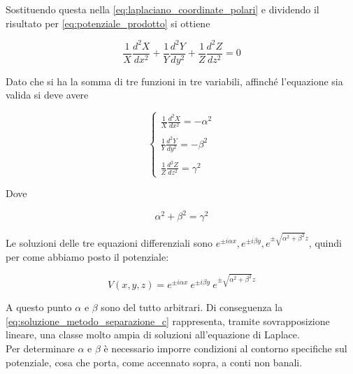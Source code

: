 Sostituendo questa nella \ref{eq:laplaciano_coordinate_polari} e dividendo il risultato per \ref{eq:potenziale_prodotto} si ottiene 

\begin{equation}
    \frac{1}{X} \frac{d^2 X}{dx^2} + \frac{1}{Y} \frac{d^2 Y}{dy^2} + \frac{1}{Z} \frac{d^2 Z}{dz^2} = 0 
\end{equation}

Dato che si ha la somma di tre funzioni in tre variabili, affinché l'equazione sia valida si deve avere  

\begin{equation}
    \begin{cases}
    \frac{1}{X} \frac{d^2 X}{dx^2} = - \alpha ^2\\
    \\
    \frac{1}{Y} \frac{d^2 Y}{dy^2} = - \beta^2 \\
    \\
    \frac{1}{Z} \frac{d^2 Z}{dz^2} = \gamma ^2
    \end{cases}
\end{equation}

Dove

\begin{equation*}
    \alpha ^2 + \beta^2 = \gamma ^2
\end{equation*}

Le soluzioni delle tre equazioni differenziali sono $e^{\pm i \alpha x}, e^{\pm i \beta y}, e^{\pm\sqrt{\alpha^2 + \beta ^2} z}$, quindi per come abbiamo posto il potenziale:

\begin{tcolorbox}[colback=yellow!10!white, colframe=orange!70!black, boxrule=0.8pt]
\begin{equation}
    V(x,y,z) = e^{\pm i \alpha x} \ e^{\pm i \beta y} \ e^{\pm\sqrt{\alpha^2 + \beta ^2} z}
    \label{eq:soluzione_metodo_separazione_c}
\end{equation}
\end{tcolorbox}

A questo punto $\alpha$ e $\beta$ sono del tutto arbitrari. Di conseguenza la \ref{eq:soluzione_metodo_separazione_c} rappresenta, tramite sovrapposizione lineare, una classe molto ampia di soluzioni all'equazione di Laplace. \\ 

Per determinare $\alpha$ e $\beta$ è necessario imporre condizioni al contorno specifiche sul potenziale, cosa che porta, come accennato sopra, a conti non banali. \\

